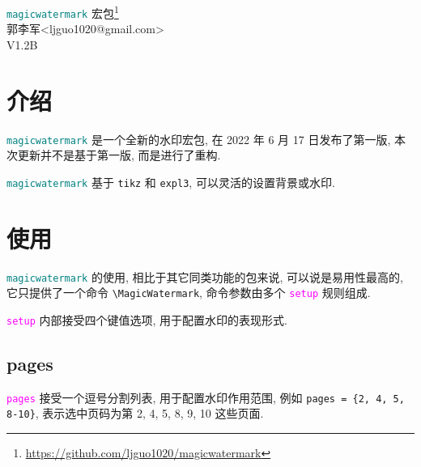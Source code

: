 \documentclass{article}
\def\pkgname{\textcolor{teal}{\texttt{magicwatermark}}}
\newcounter{example}
\def\opt#1{\textcolor{magenta}{\texttt{#1}}}
\begin{document}
\vspace*{\fill}
\begin{center}
  {\Huge \textcolor{teal}{\texttt{magicwatermark}} 宏包\footnote{\url{https://github.com/ljguo1020/magicwatermark}}} \\[.5cm]
  {\Large 郭李军<ljguo1020@gmail.com>} \\[.5cm]
  {\Large V1.2B}\\[1cm]
\begin{example}[]
\end{example}
\end{center}

\vspace*{\fill}

\newpage


\linespread{1.3}\selectfont
\tableofcontents

\section{介绍}

\pkgname{} 是一个全新的水印宏包, 在 2022 年 6 月 17 日发布了第一版, 本次更新并不是基于第一版, 而是进行了重构.

\pkgname{} 基于 \texttt{tikz} 和 \texttt{expl3}, 可以灵活的设置背景或水印.

\section{使用}
\pkgname{} 的使用, 相比于其它同类功能的包来说, 可以说是易用性最高的, 它只提供了一个命令 \verb|\MagicWatermark|, 命令参数由多个 \opt{setup} 规则组成.
\begin{example}[]
\end{example}

\opt{setup} 内部接受四个键值选项, 用于配置水印的表现形式.

\subsection{pages}
\opt{pages} 接受一个逗号分割列表, 用于配置水印作用范围, 例如 \verb|pages = {2, 4, 5, 8-10}|, 表示选中页码为第 2, 4, 5, 8, 9, 10 这些页面.
\end{document}
